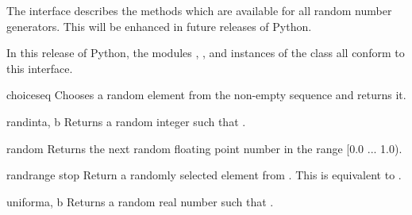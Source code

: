
The  interface describes the methods
which are available for all random number generators.  This will be
enhanced in future releases of Python.

In this release of Python, the modules ,
, and instances of the
 class all conform to this interface.


\begin{funcdesc}{choice}{seq}
Chooses a random element from the non-empty sequence  and
returns it.
\end{funcdesc}

\begin{funcdesc}{randint}{a, b}
Returns a random integer  such that
.
\end{funcdesc}

\begin{funcdesc}{random}{}
Returns the next random floating point number in the range [0.0
... 1.0).
\end{funcdesc}

\begin{funcdesc}{randrange}{ stop}
Return a randomly selected element from .  This is equivalent to
.
\end{funcdesc}

\begin{funcdesc}{uniform}{a, b}
Returns a random real number  such that
.
\end{funcdesc}

